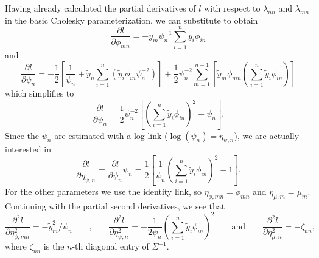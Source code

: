 \documentclass{article}
\begin{document}
Having already calculated the partial derivatives of $l$ with respect to $\lambda_{nn}$ 
and $\lambda_{mn}$ in the basic Cholesky parameterization, we can substitute 
to obtain
%
\begin{equation}
	\frac{\partial l}{\partial \phi_{mn}} = - \tilde{y}_m \psi_n^{-1} 
	\sum_{i=1}^n \tilde{y_i} \phi_{in} 
\end{equation}
%
and
%
\begin{equation}
	\frac{\partial l}{\partial \psi_{n}} =
        -\frac{1}{2} \left[ \frac{1}{\psi_n} + \tilde{y}_n \sum_{i=1}^n \left(
	  \tilde{y}_i \phi_{in} \psi_n^{-2} \right) \right] + 
	\frac{1}{2} \psi_n^{-2} \sum_{m=1}^{n-1} \left[ \tilde{y}_m \phi_{mn} 
	  \left( \sum_{i=1}^n \tilde{y}_i \phi_{in} \right) \right]
\end{equation}
%
which simplifies to
%
\begin{equation}
  \frac{\partial l}{\partial \psi_{n}} = \frac{1}{2} \psi_n^{-2} 
    \left[ \left( \sum_{i = 1}^n \tilde{y}_i \phi_{in} \right) ^2 - \psi_n \right].
\end{equation}
%
Since the $\psi_n$ are estimated with a log-link ($\log(\psi_n) = \eta_{\psi,n}$), 
we are actually interested in 
%
\begin{equation}	   
  \frac{\partial l}{\partial \eta_{\psi,n}} =
	\frac{\partial l}{\partial \psi_{n}} \psi_{n} 
	 =   \frac{1}{2} 
	\left[ \frac{1}{\psi_n} \left( \sum_{i = 1}^n \tilde{y}_i \phi_{in} \right) ^2 - 1 \right].
\end{equation}
For the other parameters we use the identity link, so $\eta_{\phi,mn} = \phi_{mn}$ 
and $\eta_{\mu,m} = \mu_{m}$. 
\hfill \\

Continuing with the partial second derivatives, we see that
%
\begin{equation}	   
	\frac{\partial^2 l}{\partial \eta_{\phi,mn}^2} = - \tilde{y}_m^2/ \psi_n 
	\qquad \text{,} \qquad 
	\frac{\partial^2 l}{\partial \eta_{\psi,n}^2} = -\frac{1}{2 \psi_n} 
		\left( \sum_{i = 1}^n \tilde{y}_i \phi_{in} \right) ^2
	\qquad \text{and} \qquad 
	\frac{\partial^2 l}{\partial \eta_{\mu,n}^2} = - \zeta_{nn}, 
\end{equation}
%
where $\zeta_{nn}$ is the $n$-th diagonal entry of $\Sigma^{-1}$.  
%
\end{document}
